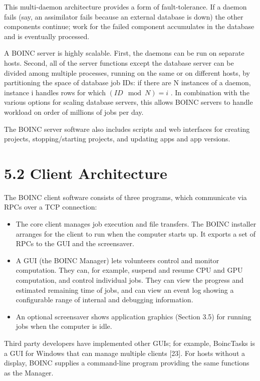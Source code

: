 \documentclass[
]{article}
\providecommand{\tightlist}{%
  \setlength{\itemsep}{0pt}\setlength{\parskip}{0pt}}
\begin{document}
This multi-daemon architecture provides a form of fault-tolerance. If a
daemon fails (say, an assimilator fails because an external database is
down) the other components continue; work for the failed component
accumulates in the database and is eventually processed.

A BOINC server is highly scalable. First, the daemons can be run on
separate hosts. Second, all of the server functions except the database
server can be divided among multiple processes, running on the same or
on different hosts, by partitioning the space of database job IDs: if
there are N instances of a daemon, instance i handles rows for which
\((ID \mod N) = i\) . In combination with the various options for
scaling database servers, this allows BOINC servers to handle workload
on order of millions of jobs per day.

The BOINC server software also includes scripts and web interfaces for
creating projects, stopping/starting projects, and updating apps and app
versions.

\section{5.2 Client Architecture}\label{client-architecture}

The BOINC client software consists of three programs, which communicate
via RPCs over a TCP connection:

\begin{itemize}
\tightlist
\item
  The core client manages job execution and file transfers. The BOINC
  installer arranges for the client to run when the computer starts up.
  It exports a set of RPCs to the GUI and the screensaver.\\
\item
  A GUI (the BOINC Manager) lets volunteers control and monitor
  computation. They can, for example, suspend and resume CPU and GPU
  computation, and control individual jobs. They can view the progress
  and estimated remaining time of jobs, and can view an event log
  showing a configurable range of internal and debugging information.\\
\item
  An optional screensaver shows application graphics (Section 3.5) for
  running jobs when the computer is idle.
\end{itemize}

Third party developers have implemented other GUIs; for example,
BoincTasks is a GUI for Windows that can manage multiple clients
{[}23{]}. For hosts without a display, BOINC supplies a command-line
program providing the same functions as the Manager.
\end{document}
